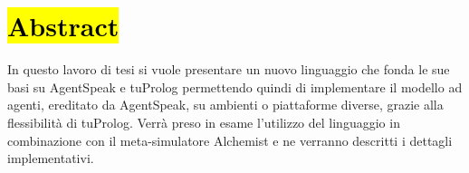\chapter*{\hl{Abstract}} %



In questo lavoro di tesi si vuole presentare un nuovo linguaggio che fonda le sue basi su AgentSpeak e tuProlog permettendo quindi di implementare il modello ad agenti, ereditato da AgentSpeak, su ambienti o piattaforme diverse, grazie alla flessibilità di tuProlog. Verrà preso in esame l'utilizzo del linguaggio in combinazione con il meta-simulatore Alchemist e ne verranno descritti i dettagli implementativi.

\clearpage{\pagestyle{empty}\cleardoublepage}

\tableofcontents

\rhead[\fancyplain{}{\bfseries\leftmark}]{\fancyplain{}{\bfseries\thepage}}

\clearpage{\pagestyle{empty}\cleardoublepage}

\listoffigures

\clearpage{\pagestyle{empty}\cleardoublepage}


\clearpage{\pagestyle{empty}\cleardoublepage}

\lstlistoflistings

\clearpage{\pagestyle{empty}\cleardoublepage}